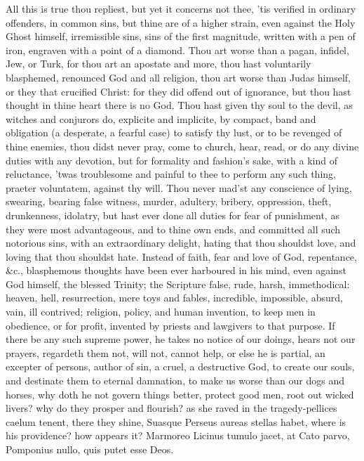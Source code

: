 {All this is true thou repliest, but yet it concerns not thee, 'tis
verified in ordinary offenders, in common sins, but thine are of a
higher strain, even against the Holy Ghost himself, irremissible sins,
sins of the first magnitude, written with a pen of iron, engraven with
a point of a diamond. Thou art worse than a pagan, infidel, Jew, or
Turk, for thou art an apostate and more, thou hast voluntarily
blasphemed, renounced God and all religion, thou art worse than Judas
himself, or they that crucified Christ: for they did offend out of
ignorance, but thou hast thought in thine heart there is no God. Thou
hast given thy soul to the devil, as witches and conjurors do,
explicite and implicite, by compact, band and obligation (a desperate,
a fearful case) to satisfy thy lust, or to be revenged of thine
enemies, thou didst never pray, come to church, hear, read, or do any
divine duties with any devotion, but for formality and fashion's sake,
with a kind of reluctance, 'twas troublesome and painful to thee to
perform any such thing, praeter voluntatem, against thy will. Thou
never mad'st any conscience of lying, swearing, bearing false witness,
murder, adultery, bribery, oppression, theft, drunkenness, idolatry,
but hast ever done all duties for fear of punishment, as they were most
advantageous, and to thine own ends, and committed all such notorious
sins, with an extraordinary delight, hating that thou shouldst love,
and loving that thou shouldst hate. Instead of faith, fear and love of
God, repentance, \&c., blasphemous thoughts have been ever harboured in
his mind, even against God himself, the blessed Trinity; the
Scripture false, rude, harsh, immethodical: heaven, hell,
resurrection, mere toys and fables, incredible, impossible,
absurd, vain, ill contrived; religion, policy, and human invention, to
keep men in obedience, or for profit, invented by priests and lawgivers
to that purpose. If there be any such supreme power, he takes no notice
of our doings, hears not our prayers, regardeth them not, will not,
cannot help, or else he is partial, an excepter of persons, author of
sin, a cruel, a destructive God, to create our souls, and destinate
them to eternal damnation, to make us worse than our dogs and horses,
why doth he not govern things better, protect good men, root out wicked
livers? why do they prosper and flourish? as she raved in the
tragedy-pellices caelum tenent, there they shine, Suasque Perseus
aureas stellas habet, where is his providence? how appears it?
Marmoreo Licinus tumulo jacet, at Cato parvo,
Pomponius nullo, quis putet esse Deos.

}
